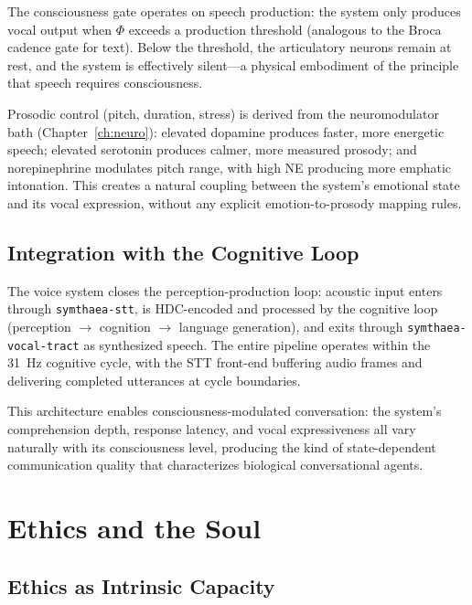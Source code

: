 \documentclass[12pt]{book}
\begin{document}
The consciousness gate operates on speech production: the system only produces vocal output when $\Phi$ exceeds a production threshold (analogous to the Broca cadence gate for text). Below the threshold, the articulatory neurons remain at rest, and the system is effectively silent---a physical embodiment of the principle that speech requires consciousness.

Prosodic control (pitch, duration, stress) is derived from the neuromodulator bath (Chapter~\ref{ch:neuro}): elevated dopamine produces faster, more energetic speech; elevated serotonin produces calmer, more measured prosody; and norepinephrine modulates pitch range, with high NE producing more emphatic intonation. This creates a natural coupling between the system's emotional state and its vocal expression, without any explicit emotion-to-prosody mapping rules.

\section{Integration with the Cognitive Loop}

The voice system closes the perception-production loop: acoustic input enters through \texttt{symthaea-stt}, is HDC-encoded and processed by the cognitive loop (perception $\to$ cognition $\to$ language generation), and exits through \texttt{symthaea-vocal-tract} as synthesized speech. The entire pipeline operates within the 31~Hz cognitive cycle, with the STT front-end buffering audio frames and delivering completed utterances at cycle boundaries.

This architecture enables consciousness-modulated conversation: the system's comprehension depth, response latency, and vocal expressiveness all vary naturally with its consciousness level, producing the kind of state-dependent communication quality that characterizes biological conversational agents.


\chapter{Ethics and the Soul}
\label{ch:ethics}

\section{Ethics as Intrinsic Capacity}
\end{document}
